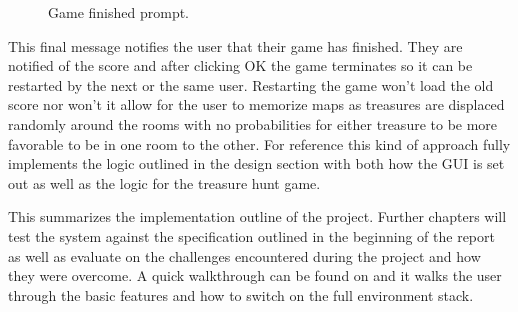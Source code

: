       \begin{figure}[htp]
        \centering
        \caption{Game finished prompt.}
      \end{figure}

      This final message notifies the user that their game has finished. They are notified of the score and after clicking OK the game terminates so it can be restarted by the next or the same user. Restarting the game won't load the old score nor won't it allow for the user to memorize maps as treasures are displaced randomly around the rooms with no probabilities for either treasure to be more favorable to be in one room to the other. For reference this kind of approach fully implements the logic outlined in the design section with both how the GUI is set out as well as the logic for the treasure hunt game.

      This summarizes the implementation outline of the project. Further chapters will test the system against the specification outlined in the beginning of the report as well as evaluate on the challenges encountered during the project and how they were overcome. A quick walkthrough can be found on \cite{Dialogue full implementation} and it walks the user through the basic features and how to switch on the full environment stack.
